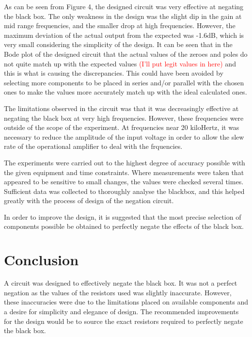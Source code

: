 \documentclass[12pt]{article} %
\begin{document}
As can be seen from Figure 4, the designed circuit was very effective at negating the black box. The only weakness in the design was the slight dip in the gain at mid range frequencies, and the smaller drop at high frequencies. However, the maximum deviation of the actual output from the expected was -1.6dB, which is very small considering the simplicity of the design. It can be seen that in the Bode plot of the designed circuit that the actual values of the zeroes and poles do not quite match up with the expected values \textcolor{red}{(I'll put legit values in here)} and this is what is causing the discrepancies. This could have been avoided by selecting more components to be placed in series and/or parallel with the chosen ones to make the values more accurately match up with the ideal calculated ones.

The limitations observed in the circuit was that it was decreasingly effective at negating the black box at very high frequencies. However, these frequencies were outside of the scope of the experiment. At frequencies near 20 kiloHertz, it was necessary to reduce the amplitude of the input voltage in order to allow the slew rate of the operational amplifier to deal with the frquencies.

The experiments were carried out to the highest degree of accuracy possible with the given equipment and time constraints. Where measurements were taken that appeared to be sensitive to small changes, the values were checked several times. Sufficient data was collected to thoroughly analyse the blackbox, and this helped greatly with the process of design of the negation circuit.

In order to improve the design, it is suggested that the most precise selection of components possible be obtained to perfectly negate the effects of the black box.

\pagebreak





\section{Conclusion}

A circuit was designed to effectively negate the black box. It was not a perfect negation as the values of the resistors used was slightly inaccurate. However, these inaccuracies were due to the limitations placed on available components and a desire for simplicity and elegance of design. The recommended improvements for the design would be to source the exact resistors required to perfectly negate the black box.
\end{document}
